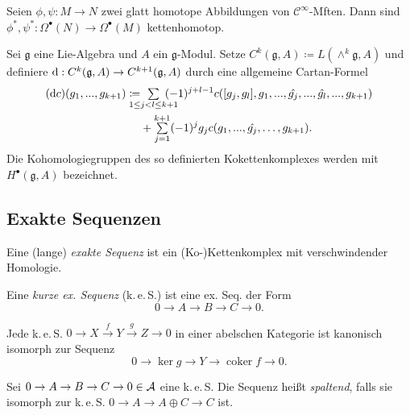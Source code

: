 \documentclass{cheat-sheet}
\newcommand{\nspace}[1]{\foreach \i in {1,...,#1}{ \! }} %
\newcommand{\keS}{k.\,e.\,S.} %
\newcommand{\Lg}{\mathfrak{g}} %
\newcommand{\Cont}{\mathcal{C}} %
\DeclareMathOperator{\coker}{coker} %
\begin{document}
\begin{prop}
  Seien $\phi, \psi : M \to N$ zwei glatt homotope Abbildungen von $\Cont^\infty$-Mften. Dann sind $\phi^*, \psi^* : \Omega^\bullet(N) \to \Omega^\bullet(M)$ kettenhomotop.
\end{prop}


\begin{defn}
  Sei $\Lg$ eine Lie-Algebra und $A$ ein $\Lg$-Modul. Setze $C^k(\Lg, A) \coloneqq L(\wedge^k \Lg, A)$ und definiere $\d : C^k(\Lg, A) \to C^{k+1}(\Lg, A)$ durch eine allgemeine Cartan-Formel
  \begin{align*}
    (\d c)(g_1, \nldots, g_{k+1}) \coloneqq & \nspace{7} \sum_{1 \leq j < l \leq k+1} \nspace{7} (-1)^{j+l-1} c([g_j, g_l], g_1, \nldots, \hat{g_j}, \nldots, \hat{g_l}, \nldots, g_{k+1}) \\
    & + \sum_{j=1}^{k+1} (-1)^j g_j c(g_1, \nldots, \hat{g_j}, \ldots, g_{k+1}).
  \end{align*}
  Die Kohomologiegruppen des so definierten Kokettenkomplexes werden mit $H^\bullet(\Lg, A)$ bezeichnet.
\end{defn}


\subsection{Exakte Sequenzen}




\begin{defn}
  Eine (lange) \emph{exakte Sequenz} ist ein (Ko-)Kettenkomplex mit verschwindender Homologie.
\end{defn}

\begin{defn}
  Eine \emph{kurze ex. Sequenz} (\keS{}) ist eine ex. Seq. der Form
  \[ 0 \to A \to B \to C \to 0. \]
\end{defn}

\begin{lem}
  Jede \keS{} $0 \to X \xrightarrow{f} Y \xrightarrow{g} Z \to 0$ in einer abelschen Kategorie ist kanonisch isomorph zur Sequenz
  \[ 0 \to \ker g \to Y \to \coker f \to 0. \]
\end{lem}

\begin{defn}
  Sei $0 \to A \to B \to C \to 0 \in \mathcal{A}$ eine \keS{}
  Die Sequenz heißt \emph{spaltend}, falls sie isomorph zur \keS{} $0 \to A \to A \oplus C \to C$ ist.
\end{defn}
\end{document}
